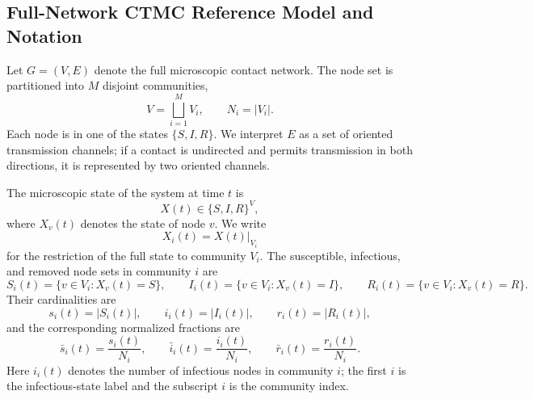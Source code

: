 \documentclass[a4paper,fleqn]{cas-sc}
\begin{document}
\subsection{Full-Network CTMC Reference Model and Notation}

Let $G=(V,E)$ denote the full microscopic contact network. The node set is partitioned into $M$ disjoint communities,
\begin{equation}
V=\bigsqcup_{i=1}^{M}V_i,
\qquad
N_i=|V_i|.
\label{eq:community_partition}
\end{equation}
Each node is in one of the states $\{S,I,R\}$. We interpret $E$ as a set of oriented transmission channels; if a contact is undirected and permits transmission in both directions, it is represented by two oriented channels.

The microscopic state of the system at time $t$ is
\[
X(t)\in\{S,I,R\}^{V},
\]
where $X_v(t)$ denotes the state of node $v$. We write
\[
X_i(t)=X(t)|_{V_i}
\]
for the restriction of the full state to community $V_i$. The susceptible, infectious, and removed node sets in community $i$ are
\[
S_i(t)=\{v\in V_i : X_v(t)=S\},
\qquad
I_i(t)=\{v\in V_i : X_v(t)=I\},
\qquad
R_i(t)=\{v\in V_i : X_v(t)=R\}.
\]
Their cardinalities are
\[
s_i(t)=|S_i(t)|,
\qquad
i_i(t)=|I_i(t)|,
\qquad
r_i(t)=|R_i(t)|,
\]
and the corresponding normalized fractions are
\[
\bar{s}_i(t)=\frac{s_i(t)}{N_i},
\qquad
\bar{i}_i(t)=\frac{i_i(t)}{N_i},
\qquad
\bar{r}_i(t)=\frac{r_i(t)}{N_i}.
\]
Here $i_i(t)$ denotes the number of infectious nodes in community $i$; the first $i$ is the infectious-state label and the subscript $i$ is the community index.
\end{document}

